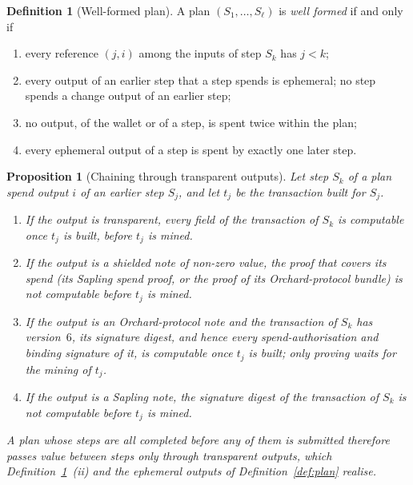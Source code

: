 \documentclass[11pt,a4paper]{article}
\newtheorem{proposition}[theorem]{Proposition}
\theoremstyle{definition}
\newtheorem{definition}[theorem]{Definition}
\begin{document}
\begin{definition}[Well-formed plan]\label{def:plan-wellformed}
A plan $(S_1, \dots, S_\ell)$ is \emph{well formed} if and only if
\begin{enumerate}[label=(\roman*)]
\item every reference $(j, i)$ among the inputs of step $S_k$ has $j < k$;
\item every output of an earlier step that a step spends is ephemeral; no
  step spends a change output of an earlier step;
\item no output, of the wallet or of a step, is spent twice within the plan;
\item every ephemeral output of a step is spent by exactly one later step.
\end{enumerate}
\end{definition}

\begin{proposition}[Chaining through transparent outputs]
\label{prop:plan-chaining}
Let step $S_k$ of a plan spend output $i$ of an earlier step $S_j$, and let
$t_j$ be the transaction built for $S_j$.
\begin{enumerate}[label=(\alph*)]
\item If the output is transparent, every field of the transaction of $S_k$
  is computable once $t_j$ is built, before $t_j$ is mined.
\item If the output is a shielded note of non-zero value, the proof that
  covers its spend (its Sapling spend proof, or the proof of its
  Orchard-protocol bundle) is not computable before $t_j$ is mined.
\item If the output is an Orchard-protocol note and the transaction of
  $S_k$ has version~$6$, its signature digest, and hence every
  spend-authorisation and binding signature of it, is computable once $t_j$
  is built; only proving waits for the mining of $t_j$.
\item If the output is a Sapling note, the signature digest of the
  transaction of $S_k$ is not computable before $t_j$ is mined.
\end{enumerate}
A plan whose steps are all completed before any of them is submitted
therefore passes value between steps only through transparent outputs,
which
Definition~\ref{def:plan-wellformed}~(ii) and the ephemeral outputs of
Definition~\ref{def:plan} realise.
\end{proposition}
\end{document}
